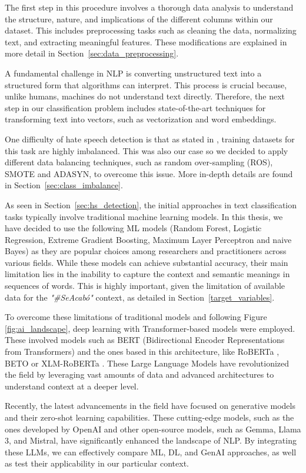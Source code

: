 The first step in this procedure involves a thorough data analysis to understand the structure, nature, and implications of the different columns within our dataset. This includes preprocessing tasks such as cleaning the data, normalizing text, and extracting meaningful features. These modifications are explained in more detail in Section~\ref{sec:data_preprocessing}.

A fundamental challenge in NLP is converting unstructured text into a structured form that algorithms can interpret. This process is crucial because, unlike humans, machines do not understand text directly. Therefore, the next step in our classification problem includes state-of-the-art techniques for transforming text into vectors, such as vectorization and word embeddings.

One difficulty of hate speech detection is that as stated in \cite{cao-2020}, training datasets for this task are highly imbalanced. This was also our case so we decided to apply different data balancing techniques, such as random over-sampling (ROS), SMOTE and ADASYN, to overcome this issue. More in-depth details are found in Section~\ref{sec:class_imbalance}.

As seen in Section~\ref{sec:hs_detection}, the initial approaches in text classification tasks typically involve traditional machine learning models. In this thesis, we have decided to use the following ML models (Random Forest, Logistic Regression, Extreme Gradient Boosting, Maximum Layer Perceptron and naive Bayes) as they are popular choices among researchers and practitioners across various fields.  While these models can achieve substantial accuracy, their main limitation lies in the inability to capture the context and semantic meanings in sequences of words. This is highly important, given the limitation of available data for the \textit{"\#SeAcabó"} context, as detailed in Section~\ref{target_variables}.

To overcome these limitations of traditional models and following Figure \ref{fig:ai_landscape}, deep learning with Transformer-based models were employed. These involved models such as BERT (Bidirectional Encoder Representations from Transformers) \cite{devlin-2018} and the ones based in this architecture, like RoBERTa \cite{liu-2019}, BETO \cite{cañete-2023} or XLM-RoBERTa \cite{conneau-2020}. These Large Language Models have revolutionized the field by leveraging vast amounts of data and advanced architectures to understand context at a deeper level.

Recently, the latest advancements in the field have focused on generative models and their zero-shot learning capabilities. These cutting-edge models, such as the ones developed by OpenAI and other open-source models, such as Gemma, Llama 3, and Mistral, have significantly enhanced the landscape of NLP. By integrating these LLMs, we can effectively compare ML, DL, and GenAI approaches, as well as test their applicability in our particular context. 